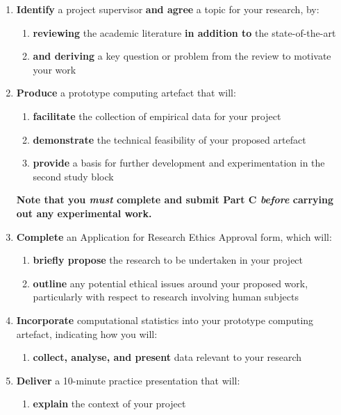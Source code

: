 \begin{enumerate}[label=(\Alph*)]
	\item \textbf{Identify} a project supervisor \textbf{and agree} a topic for your research, by:
		\begin{enumerate}[label=(\roman*)]
			\item \textbf{reviewing} the academic literature \textbf{in addition to} the state-of-the-art
			\item \textbf{and deriving} a key question or problem from the review to motivate your work
		\end{enumerate}
	\item \textbf{Produce} a prototype computing artefact that will:
		\begin{enumerate}[label=(\roman*)]
			\item \textbf{facilitate} the collection of empirical data for your project
			\item \textbf{demonstrate} the technical feasibility of your proposed artefact
			\item \textbf{provide} a basis for further development and
				experimentation in the second study block
		\end{enumerate}
		\textbf{Note that you \textit{must} complete and submit Part C
		\textit{before} carrying out any experimental work.}
	\item \textbf{Complete} an Application for Research Ethics Approval form,
		which will:
		\begin{enumerate}[label=(\roman*)]
			\item \textbf{briefly propose} the research to be undertaken in your project
			\item \textbf{outline} any potential ethical issues around your proposed work,
				particularly with respect to research involving human subjects
		\end{enumerate}
	\item \textbf{Incorporate} computational statistics into your prototype computing artefact, indicating how you will:
		\begin{enumerate}[label=(\roman*)]
			\item \textbf{collect, analyse, and present} data relevant to your research
		\end{enumerate}
	\item \textbf{Deliver} a 10-minute practice presentation that will:
		\begin{enumerate}[label=(\roman*)]
			\item \textbf{explain} the context of your project

\end{enumerate}
\end{enumerate}
